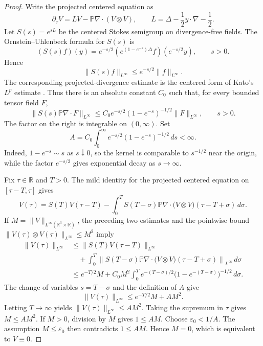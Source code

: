 \documentclass[11pt]{amsart}
\theoremstyle{plain}
\theoremstyle{definition}
\theoremstyle{remark}
\numberwithin{equation}{section}
\begin{document}
\begin{proof}
Write the projected centered equation as
\[
   \partial_\tau V=LV-\mathbb P\nabla\cdot(V\otimes V),
   \qquad
   L=\Delta-\frac12y\cdot\nabla-\frac12 .
\]
Let \(S(s)=e^{sL}\) be the centered Stokes semigroup on divergence-free
fields.  The Ornstein--Uhlenbeck formula for \(S(s)\) is
\[
   (S(s)f)(y)
   =
   e^{-s/2}
   \left(e^{(1-e^{-s})\Delta}f\right)(e^{-s/2}y),
   \qquad s>0.
\]
Hence
\[
   \|S(s)f\|_{L^\infty}\le e^{-s/2}\|f\|_{L^\infty}.
\]
The corresponding projected-divergence estimate is the centered form of
Kato's \(L^p\) estimate \cite{Kato1984}.  Thus there is an absolute constant
\(C_0\) such that, for
every bounded tensor field \(F\),
\[
   \|S(s)\mathbb P\nabla\cdot F\|_{L^\infty}
   \le
   C_0 e^{-s/2}(1-e^{-s})^{-1/2}\|F\|_{L^\infty},
   \qquad s>0.
\]
The factor on the right is integrable on \((0,\infty)\).  Set
\[
   A=C_0\int_0^\infty e^{-s/2}(1-e^{-s})^{-1/2}\,ds<\infty .
\]
Indeed, \(1-e^{-s}\sim s\) as \(s\downarrow0\), so the kernel is comparable to
\(s^{-1/2}\) near the origin, while the factor \(e^{-s/2}\) gives exponential
decay as \(s\to\infty\).

Fix \(\tau\in\mathbb R\) and \(T>0\).  The mild identity for the projected
centered equation on \([\tau-T,\tau]\) gives
\[
   V(\tau)
   =
   S(T)V(\tau-T)
   -
   \int_0^T
      S(T-\sigma)\mathbb P\nabla\cdot
      \bigl(V\otimes V\bigr)(\tau-T+\sigma)\,d\sigma .
\]
If \(M=\|V\|_{L^\infty(\mathbb R^3\times\mathbb R)}\), the preceding two
estimates and the pointwise bound
\(\|V(\tau)\otimes V(\tau)\|_{L^\infty}\le M^2\) imply
\[
\begin{aligned}
   \|V(\tau)\|_{L^\infty}
   &\le
   \|S(T)V(\tau-T)\|_{L^\infty}  \\
   &\quad+
   \int_0^T
      \left\|
      S(T-\sigma)\mathbb P\nabla\cdot
      \bigl(V\otimes V\bigr)(\tau-T+\sigma)
      \right\|_{L^\infty}\,d\sigma        \\
   &\le
   e^{-T/2}M
   +
   C_0 M^2\int_0^T
      e^{-(T-\sigma)/2}
      \bigl(1-e^{-(T-\sigma)}\bigr)^{-1/2}\,d\sigma .
\end{aligned}
\]
The change of variables \(s=T-\sigma\) and the definition of \(A\) give
\[
   \|V(\tau)\|_{L^\infty}
   \le
   e^{-T/2}M
   +
   A M^2 .
\]
Letting \(T\to\infty\) yields \(\|V(\tau)\|_{L^\infty}\le A M^2\).  Taking
the supremum in \(\tau\) gives \(M\le A M^2\).  If \(M>0\), division by \(M\)
gives \(1\le AM\).  Choose \(\varepsilon_0<1/A\).  The assumption
\(M\le\varepsilon_0\) then contradicts \(1\le AM\).  Hence \(M=0\), which is
equivalent to \(V\equiv0\).
\end{proof}
\end{document}
